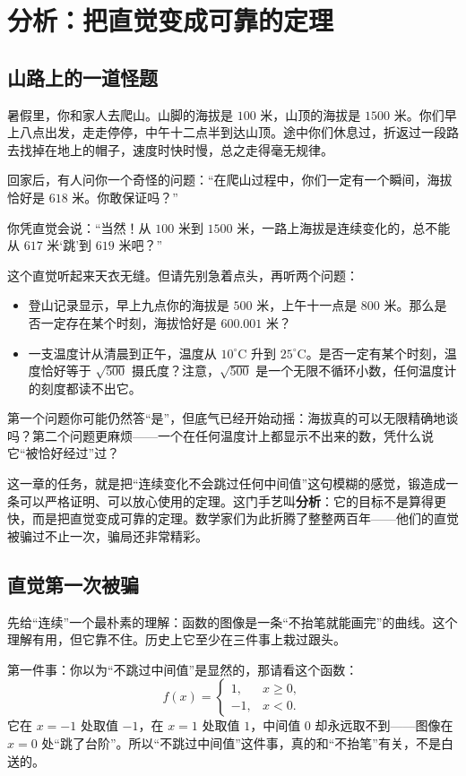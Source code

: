 \chapter{分析：把直觉变成可靠的定理}

\section{山路上的一道怪题}

暑假里，你和家人去爬山。山脚的海拔是 $100$ 米，山顶的海拔是 $1500$ 米。你们早上八点出发，走走停停，中午十二点半到达山顶。途中你们休息过，折返过一段路去找掉在地上的帽子，速度时快时慢，总之走得毫无规律。

回家后，有人问你一个奇怪的问题：“在爬山过程中，你们一定有一个瞬间，海拔恰好是 $618$ 米。你敢保证吗？”

你凭直觉会说：“当然！从 $100$ 米到 $1500$ 米，一路上海拔是连续变化的，总不能从 $617$ 米‘跳’到 $619$ 米吧？”

这个直觉听起来天衣无缝。但请先别急着点头，再听两个问题：

\begin{itemize}
  \item 登山记录显示，早上九点你的海拔是 $500$ 米，上午十一点是 $800$ 米。那么是否一定存在某个时刻，海拔恰好是 $600.001$ 米？
  \item 一支温度计从清晨到正午，温度从 $10^\circ$C 升到 $25^\circ$C。是否一定有某个时刻，温度恰好等于 $\sqrt{500}$ 摄氏度？注意，$\sqrt{500}$ 是一个无限不循环小数，任何温度计的刻度都读不出它。
\end{itemize}

第一个问题你可能仍然答“是”，但底气已经开始动摇：海拔真的可以无限精确地谈吗？第二个问题更麻烦——一个在任何温度计上都显示不出来的数，凭什么说它“被恰好经过”过？

这一章的任务，就是把“连续变化不会跳过任何中间值”这句模糊的感觉，锻造成一条可以严格证明、可以放心使用的定理。这门手艺叫\textbf{分析}：它的目标不是算得更快，而是把直觉变成可靠的定理。数学家们为此折腾了整整两百年——他们的直觉被骗过不止一次，骗局还非常精彩。

\section{直觉第一次被骗}

先给“连续”一个最朴素的理解：函数的图像是一条“不抬笔就能画完”的曲线。这个理解有用，但它靠不住。历史上它至少在三件事上栽过跟头。

第一件事：你以为“不跳过中间值”是显然的，那请看这个函数：
\[
f(x)=\begin{cases}1, & x\ge 0,\\ -1, & x<0.\end{cases}
\]
它在 $x=-1$ 处取值 $-1$，在 $x=1$ 处取值 $1$，中间值 $0$ 却永远取不到——图像在 $x=0$ 处“跳了台阶”。所以“不跳过中间值”这件事，真的和“不抬笔”有关，不是白送的。

